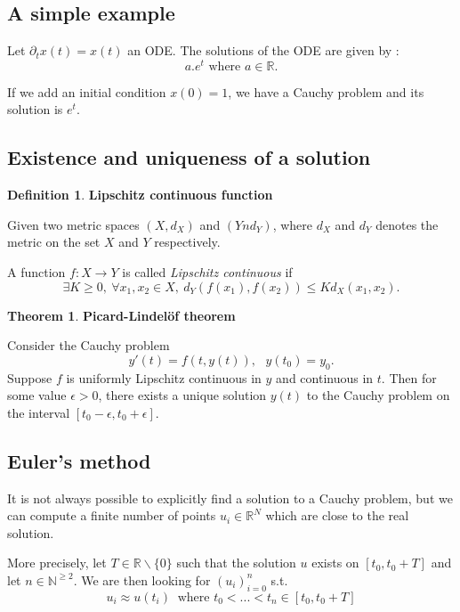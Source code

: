 \documentclass[10pt,a4paper]{article}
\theoremstyle{definition}
\newtheorem{definition}{Definition}
\theoremstyle{definition}
\newtheorem{theorem}{Theorem}
\begin{document}
\subsection{A simple example}
Let $\partial_t x(t) = x(t)$ an ODE. The solutions of the ODE are given by : 
$$
a . e^t \text{ where } a\in \mathbb{R}.
$$

If we add an initial condition $x(0) = 1$, we have a Cauchy problem and its solution is $e^t$.

\subsection{Existence and uniqueness of a solution}


\begin{definition}{\textbf{Lipschitz continuous function}}

Given two metric spaces $(X, d_X)$ and $(Yn d_Y)$, where $d_X$ and $d_Y$ denotes the metric on the set $X$ and $Y$ respectively. 

A function $f: X \rightarrow  Y$ is called \textit{Lipschitz continuous} if
$$
\exists K \geq 0, \  \forall x_1, x_2 \in X, \  d_Y(f(x_1), f(x_2)) \leq Kd_X(x_1, x_2).
$$
\end{definition}

\begin{theorem}{\textbf{Picard-Lindelöf theorem}}

Consider the Cauchy problem
$$
y'(t) = f(t, y(t)), \ \ \ y(t_0) = y_0.
$$
Suppose $f$ is uniformly Lipschitz continuous in $y$ and continuous in $t$. Then for some value $\epsilon > 0$, there exists a unique solution $y(t)$ to the Cauchy problem on the interval $[t_0 - \epsilon, t_0 + \epsilon]$. 
\end{theorem}

\subsection{Euler's method}
It is not always possible to explicitly find a solution to a Cauchy problem, but we can compute a finite number of points $u_i \in \mathbb{R}^N$ which are close to the real solution. 

More precisely, let $T \in \mathbb{R}\backslash\{0\}$ such that the solution $u$ exists on $[t_0, t_0 + T]$ and let $n \in \mathbb{N}^{\geqslant 2}$. We are then looking for $(u_i)^n_{i=0}$ s.t. 
\[
u_i \approx u(t_i) \ \text{ where } t_0 < ... < t_n \in [t_0, t_0 + T]
\]
\end{document}
